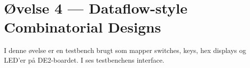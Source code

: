 \section{Øvelse 4 --- Dataflow-style Combinatorial Designs}

I denne øvelse er en testbench brugt som mapper switches, keys, hex displays og LED'er på DE2-boardet. I  ses testbenchens interface.





